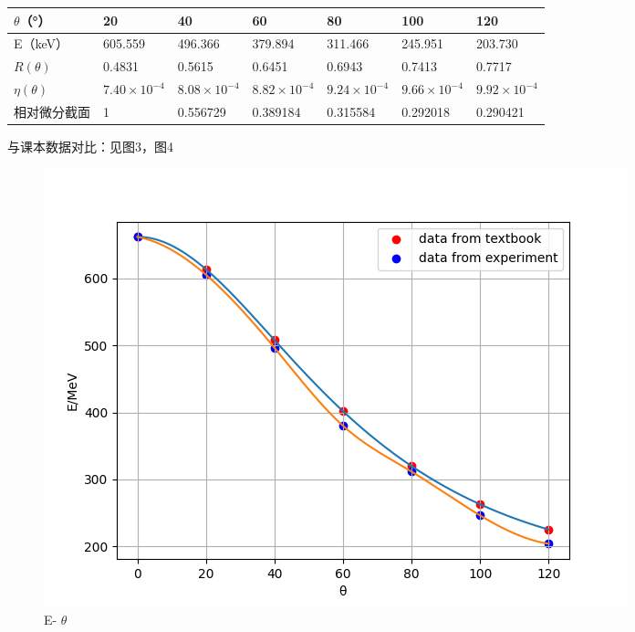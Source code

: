 \documentclass[font=default]{mpltx}
\begin{document}
\begin{table}[!ht]
    \centering
    \begin{tabular}{|l|l|l|l|l|l|l|}
    \hline
$\theta$（°）         & 20                     &40                             &60                   &80                     &100                        &120 \\ \hline
E（keV）              & 605.559               &496.366                        &379.894                 &311.466              &245.951                 &203.730 \\ \hline
$R(\theta)$          & 0.4831                 &0.5615                           &0.6451              &0.6943                 &0.7413                    &0.7717 \\ \hline
$\eta(\theta)$     & $7.40 \times {10}^{-4}$  & $8.08 \times {10}^{-4}$  &$8.82 \times {10}^{-4}$ &$9.24 \times {10}^{-4}$  &$9.66 \times {10}^{-4}$     &$9.92 \times {10}^{-4}$    \\ \hline
相对微分截面          & 1                     &0.556729                         &0.389184               &0.315584            &0.292018                     &0.290421  \\ \hline
    \end{tabular}
\end{table}

与课本数据对比：见图3，图4

\begin{figure}
  \centering
  \includegraphics[width=0.85\linewidth]{fig/figure_1.png}
  \caption{E- $\theta$}
  \label{sec:figure_1}
\end{figure}
\end{document}
